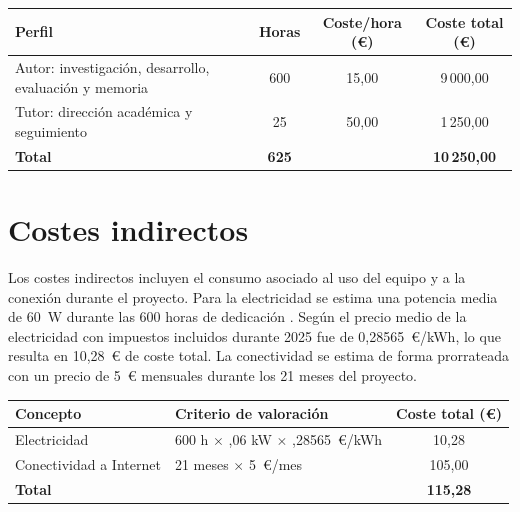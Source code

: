 \documentclass[12pt]{report} %
\begin{document}
\begin{table}[H]
    {\begin{tabular}{|p{4.3cm}|c|c|c|}
            \hline
            \textbf{Perfil}                                        & \textbf{Horas} & \textbf{Coste/hora (€)} & \textbf{Coste total (€)} \\
            \hline
            Autor: investigación, desarrollo, evaluación y memoria & 600            & 15{,}00                 & 9\,000{,}00              \\
            \hline
            Tutor: dirección académica y seguimiento               & 25             & 50{,}00                 & 1\,250{,}00              \\
            \hline
            \textbf{Total}                                         & \textbf{625}   &                         & \textbf{10\,250{,}00}    \\
            \hline
        \end{tabular}}
\end{table}

\section{Costes indirectos}

Los costes indirectos incluyen el consumo asociado al uso del equipo y a la conexión durante el proyecto. Para la electricidad se estima una potencia media de 60~W durante las 600 horas de dedicación \cite{apple_macbook_pro_m1_2020}. Según \cite{eurostat_electricity_2025} el precio medio de la electricidad con impuestos incluidos durante 2025 fue de 0{,}28565~€/kWh, lo que resulta en 10{,}28~€ de coste total. La conectividad se estima de forma prorrateada con un precio de 5~€ mensuales durante los 21 meses del proyecto.

\begin{table}[H]
    {\begin{tabular}{|p{5.2cm}|p{4.1cm}|c|}
            \hline
            \textbf{Concepto}       & \textbf{Criterio de valoración}                   & \textbf{Coste total (€)} \\
            \hline
            Electricidad            & $600$ h $\times$ {,}06 kW $\times$ {,}28565~€/kWh & 10{,}28                  \\
            \hline
            Conectividad a Internet & 21 meses $\times$ 5~€/mes                         & 105{,}00                 \\
            \hline
            \textbf{Total}          &                                                   & \textbf{115{,}28}        \\
            \hline
        \end{tabular}}
\end{table}
\end{document}
